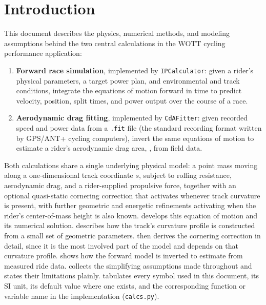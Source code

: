 \section{Introduction}
\label{sec:intro}

This document describes the physics, numerical methods, and modeling assumptions
behind the two central calculations in the WOTT cycling performance application:

\begin{enumerate}
    \item \textbf{Forward race simulation}, implemented by \nolinkurl{IPCalculator}:
    given a rider's physical parameters, a target power plan, and environmental and
    track conditions, integrate the equations of motion forward in time to predict
    velocity, position, split times, and power output over the course of a race.

    \item \textbf{Aerodynamic drag fitting}, implemented by \nolinkurl{CdAFitter}:
    given recorded speed and power data from a \nolinkurl{.fit} file (the standard
    recording format written by GPS/ANT+ cycling computers), invert the same
    equations of motion to estimate a rider's aerodynamic drag area, \CdA{}, from
    field data.
\end{enumerate}

Both calculations share a single underlying physical model: a point mass moving
along a one-dimensional track coordinate $s$, subject to rolling resistance,
aerodynamic drag, and a rider-supplied propulsive force, together with an optional
quasi-static cornering correction that activates whenever track curvature is
present, with further geometric and energetic refinements activating when the
rider's center-of-mass height is also known.  develops this
equation of motion and its numerical solution. 
describes how the track's curvature profile is constructed from a small set of
geometric parameters.  then derives the cornering
correction in detail, since it is the most involved part of the model and
depends on that curvature profile. 
shows how the forward model is inverted to estimate \CdA{} from measured ride
data.  collects the simplifying assumptions made throughout
and states their limitations plainly.  tabulates every symbol
used in this document, its SI unit, its default value where one exists, and the
corresponding function or variable name in the implementation
(\nolinkurl{calcs.py}).

